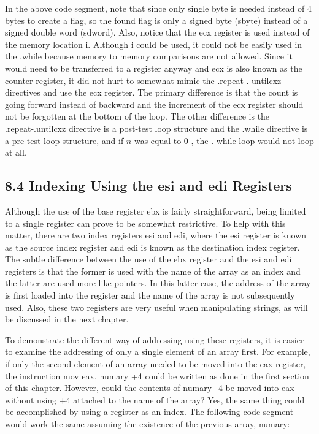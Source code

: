 \documentclass[10pt]{article}
\begin{document}
In the above code segment, note that since only single byte is needed instead of 4 bytes to create a flag, so the found flag is only a signed byte (sbyte) instead of a signed double word (sdword). Also, notice that the ecx register is used instead of the memory location i. Although i could be used, it could not be easily used in the .while because memory to memory comparisons are not allowed. Since it would need to be transferred to a register anyway and ecx is also known as the counter register, it did not hurt to somewhat mimic the .repeat-. untilcxz directives and use the ecx register. The primary difference is that the count is going forward instead of backward and the increment of the ecx register should not be forgotten at the bottom of the loop. The other difference is the .repeat-.untilcxz directive is a post-test loop structure and the .while directive is a pre-test loop structure, and if $n$ was equal to 0 , the . while loop would not loop at all.

\subsection*{8.4 Indexing Using the esi and edi Registers}
Although the use of the base register ebx is fairly straightforward, being limited to a single register can prove to be somewhat restrictive. To help with this matter, there are two index registers esi and edi, where the esi register is known as the source index register and edi is known as the destination index register. The subtle difference between the use of the ebx register and the esi and edi registers is that the former is used with the name of the array as an index and the latter are used more like pointers. In this latter case, the address of the array is first loaded into the register and the name of the array is not subsequently used. Also, these two registers are very useful when manipulating strings, as will be discussed in the next chapter.

To demonstrate the different way of addressing using these registers, it is easier to examine the addressing of only a single element of an array first. For example, if only the second element of an array needed to be moved into the eax register, the instruction mov eax, numary +4 could be written as done in the first section of this chapter. However, could the contents of numary+4 be moved into eax without using +4 attached to the name of the array? Yes, the same thing could be accomplished by using a register as an index. The following code segment would work the same assuming the existence of the previous array, numary:
\end{document}
